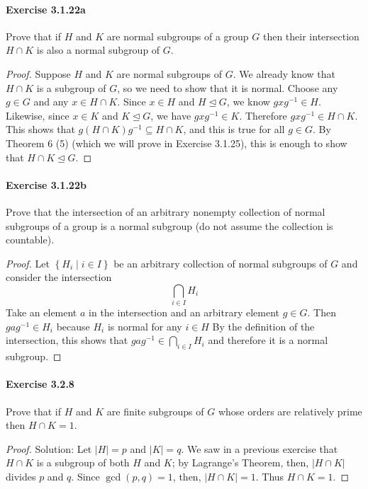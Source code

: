 \documentclass{article}
\theoremstyle{definition}
\begin{document}
\paragraph{Exercise 3.1.22a} Prove that if $H$ and $K$ are normal subgroups of a group $G$ then their intersection $H \cap K$ is also a normal subgroup of $G$.
\begin{proof}
    Suppose $H$ and $K$ are normal subgroups of $G$. We already know that $H \cap K$ is a subgroup of $G$, so we need to show that it is normal. Choose any $g \in G$ and any $x \in H \cap K$. Since $x \in H$ and $H \unlhd G$, we know $g x g^{-1} \in H$. Likewise, since $x \in K$ and $K \unlhd G$, we have $g x g^{-1} \in K$. Therefore $g x g^{-1} \in H \cap K$. This shows that $g(H \cap K) g^{-1} \subseteq H \cap K$, and this is true for all $g \in G$. By Theorem 6 (5) (which we will prove in Exercise 3.1.25), this is enough to show that $H \cap K \unlhd G$.
\end{proof}



\paragraph{Exercise 3.1.22b} Prove that the intersection of an arbitrary nonempty collection of normal subgroups of a group is a normal subgroup (do not assume the collection is countable).
\begin{proof}
Let $\left\{H_i \mid i \in I\right\}$ be an arbitrary collection of normal subgroups of $G$ and consider the intersection
$$
\bigcap_{i \in I} H_i
$$
Take an element $a$ in the intersection and an arbitrary element $g \in G$. Then $g a g^{-1} \in H_i$ because $H_i$ is normal for any $i \in H$
By the definition of the intersection, this shows that $g a g^{-1} \in \bigcap_{i \in I} H_i$ and therefore it is a normal subgroup.
\end{proof}



\paragraph{Exercise 3.2.8} Prove that if $H$ and $K$ are finite subgroups of $G$ whose orders are relatively prime then $H \cap K=1$.
\begin{proof}
    Solution: Let $|H|=p$ and $|K|=q$. We saw in a previous exercise that $H \cap K$ is a subgroup of both $H$ and $K$; by Lagrange's Theorem, then, $|H \cap K|$ divides $p$ and $q$. Since $\operatorname{gcd}(p, q)=1$, then, $|H \cap K|=1$. Thus $H \cap K=1$.
\end{proof}
\end{document}
